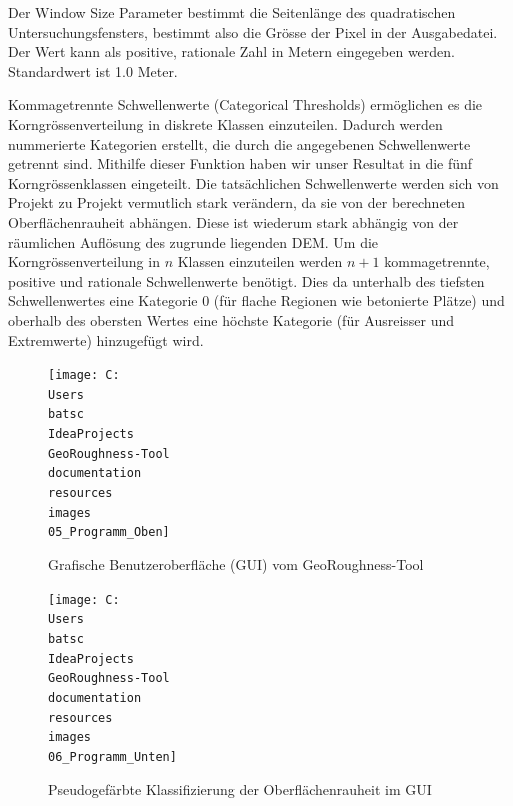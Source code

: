 \documentclass[12pt]{article}
\begin{document}
        Der Window Size Parameter bestimmt die Seitenlänge des quadratischen Untersuchungsfensters, bestimmt also die Grösse der Pixel in der Ausgabedatei.
        Der Wert kann als positive, rationale Zahl in Metern eingegeben werden.
        Standardwert ist 1.0 Meter. %

        Kommagetrennte Schwellenwerte (Categorical Thresholds) ermöglichen es die Korngrössenverteilung in diskrete Klassen einzuteilen.
        Dadurch werden nummerierte Kategorien erstellt, die durch die angegebenen Schwellenwerte getrennt sind.
        Mithilfe dieser Funktion haben wir unser Resultat in die fünf Korngrössenklassen eingeteilt.
        Die tatsächlichen Schwellenwerte werden sich von Projekt zu Projekt vermutlich stark verändern, da sie von der berechneten Oberflächenrauheit abhängen.
        Diese ist wiederum stark abhängig von der räumlichen Auflösung des zugrunde liegenden DEM.
        Um die Korngrössenverteilung in $n$ Klassen einzuteilen werden $n+1$ kommagetrennte, positive und rationale Schwellenwerte benötigt.
        Dies da unterhalb des tiefsten Schwellenwertes eine Kategorie 0 (für flache Regionen wie betonierte Plätze) und oberhalb des obersten Wertes eine höchste Kategorie (für Ausreisser und Extremwerte) hinzugefügt wird.

        \begin{minipage}{.45\textwidth}
            \begin{figure}[H]
                \centering
                \texttt{[image: C:\\Users\\batsc\\IdeaProjects\\GeoRoughness-Tool\\documentation\\resources\\images\\05\_Programm\_Oben]}
                \caption{Grafische Benutzeroberfläche (GUI) vom GeoRoughness-Tool}
                \label{fig:05_programm_oben}
            \end{figure}
        \end{minipage}
        \hfill
        \begin{minipage}{.45\textwidth}
            \begin{figure}[H]
                \centering
                \texttt{[image: C:\\Users\\batsc\\IdeaProjects\\GeoRoughness-Tool\\documentation\\resources\\images\\06\_Programm\_Unten]}
                \caption{Pseudogefärbte Klassifizierung der Oberflächenrauheit im GUI}
                \label{fig:06_programm_unten}
            \end{figure}
        \end{minipage}
\end{document}
